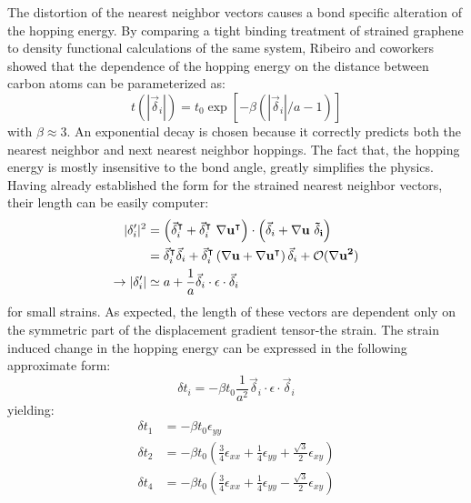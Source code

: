 The distortion of the nearest neighbor vectors causes a bond specific alteration of the hopping energy.
By comparing a tight binding treatment of strained graphene to density functional calculations of the same system, Ribeiro and coworkers showed that the dependence of the hopping energy on the distance between carbon atoms can be parameterized as:
\begin{equation*}
  t(|\vec{\delta}_i|)=t_0 \exp[-\beta (|\vec{\delta}_i|/a-1)]
\end{equation*}
with $\beta\approx 3$\cite{Pereira2009,Ribeiro2009,CastroNeto2009}.
An exponential decay is chosen because it correctly predicts both the nearest neighbor and next nearest neighbor hoppings.
The fact that, the hopping energy is mostly insensitive to the bond angle, greatly simplifies the physics.
Having already established the form for the strained nearest neighbor vectors, their length can be easily computer:
\begin{align*}
  |\delta'_i|^2&=\left(\vec{\delta}_i^{\intercal}+\vec{\delta}_i^{\intercal} \ \bf{\nabla u}^{\intercal} \right) \cdot
    \left(\vec{\delta}_i+\bf{\nabla u} \ \vec{\delta}_i \right) \\
    &=\vec{\delta}_i^{\intercal} \vec{\delta}_i+
      \vec{\delta}_i^{\intercal} \left(\bf{\nabla u}+\bf{\nabla u}^{\intercal} \right) \vec{\delta}_i+
      \mathcal{O}(\bf{\nabla u}^2) \\
  \rightarrow |\delta'_i|&\simeq a+\frac{1}{a} \vec{\delta}_i \cdot \epsilon \cdot \vec{\delta}_i
\end{align*}
for small strains.
As expected, the length of these vectors are dependent only on the symmetric part of the displacement gradient tensor-the strain.
The strain induced change in the hopping energy can be expressed in the following approximate form:
\begin{equation*}
  \delta t_i=-\beta t_0 \frac{1}{a^2} \vec{\delta}_i \cdot \epsilon \cdot \vec{\delta}_i
\end{equation*}
yielding:
\begin{align*}
  \delta t_1&=-\beta t_0 \epsilon_{yy} \\
  \delta t_2&=-\beta t_0 \left( \frac{3}{4}\epsilon_{xx} +\frac{1}{4} \epsilon_{yy} + \frac{\sqrt{3}}{2} \epsilon_{xy} \right) \\
  \delta t_4&=-\beta t_0 \left( \frac{3}{4}\epsilon_{xx} +\frac{1}{4} \epsilon_{yy} - \frac{\sqrt{3}}{2} \epsilon_{xy} \right) 
\end{align*}


